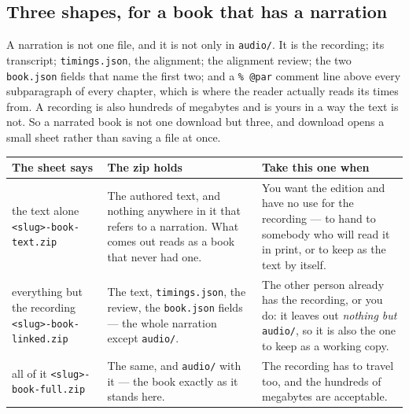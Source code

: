 \documentclass[11pt,oneside]{report}
\newcommand{\file}[1]{\texttt{#1}}
\newcommand{\menu}[1]{\textsf{#1}}
\begin{document}
\subsection*{Three shapes, for a book that has a narration}
\label{sec:shapes}

A narration is not one file, and it is not only in \file{audio/}. It is the
recording; its transcript; \file{timings.json}, the alignment; the alignment
review; the two \file{book.json} fields that name the first two; and a
\verb|% @par| comment line above every subparagraph of every chapter, which
is where the reader actually reads its times from. A recording is also
hundreds of megabytes and is yours in a way the text is not. So a narrated
book is not one download but three, and \menu{download} opens a small sheet
rather than saving a file at once.

\begin{center}
\begin{longtable}{@{}>{\raggedright\arraybackslash}p{}p{}p{}@{}}
\toprule
\textsf{The sheet says} & \textsf{The zip holds} & \textsf{Take this one when} \\
\midrule
\menu{the text alone} \newline \file{<slug>-book-text.zip} &
  The authored text, and nothing anywhere in it that refers to a
  narration. What comes out reads as a book that never had one. &
  You want the edition and have no use for the recording --- to hand to
  somebody who will read it in print, or to keep as the text by itself. \\
\addlinespace
\menu{everything but the recording} \newline \file{<slug>-book-linked.zip} &
  The text, \file{timings.json}, the review, the \file{book.json} fields ---
  the whole narration except \file{audio/}. &
  The other person already has the recording, or you do: it leaves out
  \emph{nothing but} \file{audio/}, so it is also the one to keep as a
  working copy. \\
\addlinespace
\menu{all of it} \newline \file{<slug>-book-full.zip} &
  The same, and \file{audio/} with it --- the book exactly as it stands
  here. &
  The recording has to travel too, and the hundreds of megabytes are
  acceptable. \\
\bottomrule
\end{longtable}
\end{center}
\end{document}
